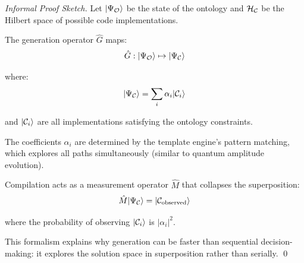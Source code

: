 \begin{proof}[Informal Proof Sketch]
Let $|\Psi_{\mathcal{O}}\rangle$ be the state of the ontology and $\mathcal{H}_{\mathcal{C}}$ be the Hilbert space of possible code implementations.

The generation operator $\hat{G}$ maps:
\begin{equation}
\hat{G}: |\Psi_{\mathcal{O}}\rangle \mapsto |\Psi_{\mathcal{C}}\rangle
\end{equation}

where:
\begin{equation}
|\Psi_{\mathcal{C}}\rangle = \sum_{i} \alpha_i |\mathcal{C}_i\rangle
\end{equation}

and $|\mathcal{C}_i\rangle$ are all implementations satisfying the ontology constraints.

The coefficients $\alpha_i$ are determined by the template engine's pattern matching, which explores all paths simultaneously (similar to quantum amplitude evolution).

Compilation acts as a measurement operator $\hat{M}$ that collapses the superposition:
\begin{equation}
\hat{M} |\Psi_{\mathcal{C}}\rangle = |\mathcal{C}_{\text{observed}}\rangle
\end{equation}

where the probability of observing $|\mathcal{C}_i\rangle$ is $|\alpha_i|^2$.

This formalism explains why generation can be faster than sequential decision-making: it explores the solution space in superposition rather than serially.
\qed
\end{proof}
